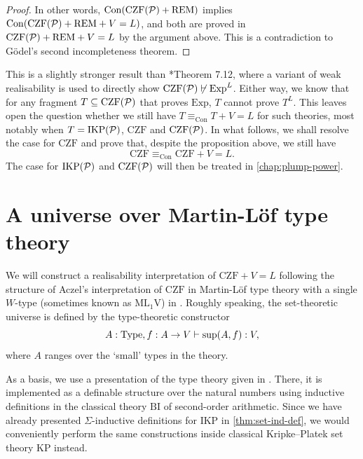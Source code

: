 \documentclass[12pt,openany]{book}
\theoremstyle{plain}
\theoremstyle{definition}
\DeclareMathOperator\Con{Con}
\newcommand\Pow{\mathcal{P}}
\newcommand\BI{\mathrm{BI}}
\newcommand\KP{\mathrm{KP}}
\newcommand\CZF{\mathrm{CZF}}
\newcommand\CZFP{\mathrm{CZF}\mleft(\Pow\mright)}
\newcommand\Exp{\mathrm{Exp}}
\newcommand\REM{\mathrm{REM}}
\newcommand\IKP{\mathrm{IKP}}
\newcommand\IKPP{\mathrm{IKP}\mleft(\Pow\mright)}
\newcommand\MLV{\mathrm{ML}_1\mathrm{V}}
\begin{document}
\begin{proof}
  In other words, $\Con\mleft(\CZFP + \REM\mright)$ implies $\Con\mleft(\CZFP + \REM + V = L\mright)$, and both are proved in $\CZFP + \REM + V = L$ by the argument above. This is a contradiction to G\"odel's second incompleteness theorem.
\end{proof}

This is a slightly stronger result than \cite{matthews-rathjen24-constructible-universe}*{Theorem 7.12}, where a variant of weak realisability is used to directly show $\CZFP \not\vdash \Exp^L$. Either way, we know that for any fragment $T \subseteq \CZFP$ that proves $\Exp$, $T$ cannot prove $T^L$. This leaves open the question whether we still have $T \equiv_{\Con} T + V = L$ for such theories, most notably when $T = \IKPP$, $\CZF$ and $\CZFP$. In what follows, we shall resolve the case for $\CZF$ and prove that, despite the proposition above, we still have
\[\CZF \equiv_{\Con} \CZF + V = L.\]
The case for $\IKPP$ and $\CZFP$ will then be treated in \autoref{chap:plump-power}.

\section{A universe over Martin-L\"of type theory}
\label{sec:mltt-interp}

We will construct a realisability interpretation of $\CZF + V = L$ following the structure of Aczel's interpretation of $\CZF$ in Martin-L\"of type theory with a single $W$-type (sometimes known as $\MLV$) in \cite{aczel78-type-theoretic-cst}. Roughly speaking, the set-theoretic universe is defined by the type-theoretic constructor
\[A : \text{Type}, f : A \rightarrow V \vdash \text{sup}\mleft(A, f\mright) : V,\]
where $A$ ranges over the `small' types in the theory.

As a basis, we use a presentation of the type theory given in \cite{rathjen14-czf-lpo}. There, it is implemented as a definable structure over the natural numbers using inductive definitions in the classical theory $\BI$ of second-order arithmetic. Since we have already presented $\Sigma$-inductive definitions for $\IKP$ in \autoref{thm:set-ind-def}, we would conveniently perform the same constructions inside classical Kripke--Platek set theory $\KP$ instead.
\end{document}
